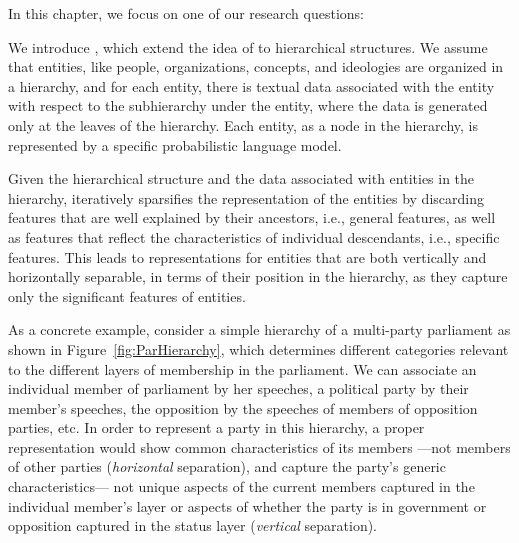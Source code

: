 In this chapter, we focus on one of our research questions:

We introduce \hswlms, which extend the idea of \swlms to hierarchical structures. We assume that entities, like people, organizations, concepts, and ideologies are organized in a hierarchy, and for each entity, there is textual data associated with the entity with respect to the subhierarchy under the entity, where the data is generated only at the leaves of the hierarchy. Each entity, as a node in the hierarchy, is represented by a specific probabilistic language model.

Given the hierarchical structure and the data associated with entities in the hierarchy, \achswlm iteratively sparsifies the representation of the entities by discarding features that are well explained by their ancestors, i.e., general features, as well as features that reflect the characteristics of individual descendants, i.e., specific features. This leads to representations for entities that are both vertically and horizontally separable, in terms of their position in the hierarchy, as they capture only the significant features of entities.


As a concrete example, consider a simple hierarchy of a multi-party parliament as shown in Figure~\ref{fig:ParHierarchy}, which determines different categories relevant to the different layers of membership in the parliament.  We can associate an individual member of parliament by her speeches, a political party by their member's speeches, the opposition by the speeches of members of opposition parties, etc. 
In order to represent a party in this hierarchy, a proper representation would show common characteristics of its members ---not members of other parties (\emph{horizontal} separation), and capture the party's generic characteristics--- not unique aspects of the current members captured in the individual member's layer or aspects of whether the party is in government or opposition captured in the status layer (\emph{vertical} separation).

